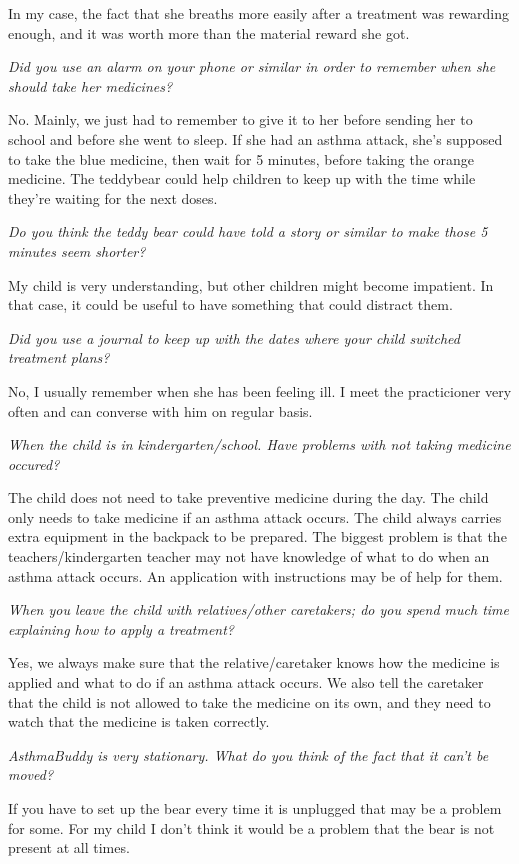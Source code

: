In my case, the fact that she breaths more easily after a treatment was rewarding enough, and it was worth more than the material reward she got. 

\emph{Did you use an alarm on your phone or similar in order to remember when she should take her medicines?}

No. Mainly, we just had to remember to give it to her before sending her to school and before she went to sleep. 
If she had an asthma attack, she's supposed to take the blue medicine, then wait for 5 minutes, before taking the orange medicine. The teddybear could help children to keep up with the time while they're waiting for the next doses. 

\emph{Do you think the teddy bear could have told a story or similar to make those 5 minutes seem shorter?}

My child is very understanding, but other children might become impatient. In that case, it could be useful to have something that could distract them. 

\emph{Did you use a journal to keep up with the dates where your child switched treatment plans?}

No, I usually remember when she has been feeling ill. I meet the practicioner very often and can converse with him on regular basis.

\emph{When the child is in kindergarten/school. Have problems with not taking medicine occured?}

The child does not need to take preventive medicine during the day. The child only needs to take medicine if an asthma attack occurs. The child always carries extra equipment in the backpack to be prepared. The biggest problem is that the teachers/kindergarten teacher may not have knowledge of what to do when an asthma attack occurs. An application with instructions may be of help for them. 


\emph{When you leave the child with relatives/other caretakers; do you spend much time explaining how to apply a treatment?}

Yes, we always make sure that the relative/caretaker knows how the medicine is applied and what to do if an asthma attack occurs. We also tell the caretaker that the child is not allowed to take the medicine on its own, and they need to watch that the medicine is taken correctly. 

\emph{AsthmaBuddy is very stationary. What do you think of the fact that it can't be moved?}

If you have to set up the bear every time it is unplugged that may be a problem for some. For my child I don't think it would be a problem that the bear is not present at all times.

